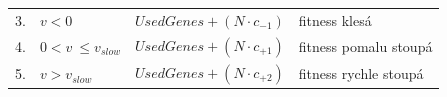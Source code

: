 \begin{table}[htb]
{\begin{tabular}{llll}
            3. &  $v < 0$                               & $\mathit{UsedGenes} + \left(N \cdot c_{-1}\right)$ & fitness klesá         \\
            4. &  $0 < v~\leq v_\mathit{slow}$              & $\mathit{UsedGenes} + \left(N \cdot c_{+1}\right)$ & fitness pomalu stoupá \\
            5. &  $v > v_\mathit{slow}$                 & $\mathit{UsedGenes} + \left(N \cdot c_{+2}\right)$ & fitness rychle stoupá \\
            \bottomrule
        \end{tabular}
    }
    \label{tabBaldwinRules}
\end{table}







